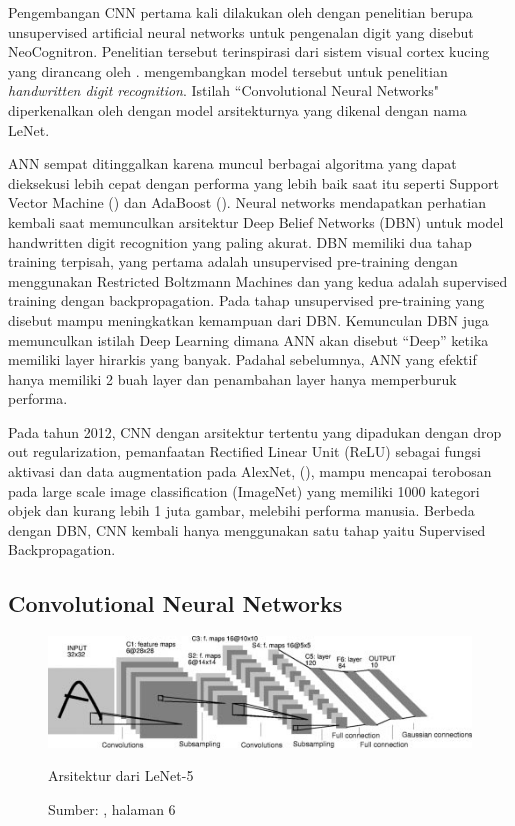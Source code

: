 Pengembangan CNN pertama kali dilakukan oleh \citet{fukushima1982neocognitron} dengan penelitian berupa unsupervised artificial neural networks untuk pengenalan digit yang disebut NeoCognitron. Penelitian tersebut terinspirasi dari sistem visual cortex kucing yang dirancang oleh \citet{hubel1962receptive}. \citet{lecun1989backpropagation} mengembangkan model tersebut untuk penelitian \textit{handwritten digit recognition}. Istilah “Convolutional Neural Networks" diperkenalkan oleh \citet{lecun1998gradient} dengan model arsitekturnya yang dikenal dengan nama LeNet.
	
ANN sempat ditinggalkan karena muncul berbagai algoritma yang dapat dieksekusi lebih cepat dengan performa yang lebih baik saat itu seperti Support Vector Machine (\citet{cortes1995support}) dan AdaBoost (\citet{freund1995desicion}). Neural networks mendapatkan perhatian kembali saat \citet{hinton2006fast} memunculkan arsitektur Deep Belief Networks (DBN) untuk model handwritten digit recognition yang paling akurat. DBN memiliki dua tahap training terpisah, yang pertama adalah unsupervised pre-training dengan menggunakan Restricted Boltzmann Machines dan yang kedua adalah supervised training dengan backpropagation. Pada tahap unsupervised pre-training yang disebut mampu meningkatkan kemampuan dari DBN. Kemunculan DBN juga memunculkan istilah Deep Learning dimana ANN akan disebut “Deep” ketika memiliki layer hirarkis yang banyak. Padahal sebelumnya, ANN yang efektif hanya memiliki 2 buah layer dan penambahan layer hanya memperburuk performa.

Pada tahun 2012, CNN dengan arsitektur tertentu yang dipadukan dengan  drop out regularization, pemanfaatan Rectified Linear Unit (ReLU) sebagai fungsi aktivasi dan data augmentation pada AlexNet, (\citet{krizhevsky2012imagenet}), mampu mencapai terobosan pada large scale image classification (ImageNet) yang memiliki 1000 kategori objek dan kurang lebih 1 juta gambar, melebihi performa manusia. Berbeda dengan DBN, CNN kembali hanya menggunakan satu tahap yaitu Supervised Backpropagation.

\subsection{Convolutional Neural Networks}
\begin{figure}[ht]
 \includegraphics[width=\textwidth]{lecunCNN}
 \caption{Arsitektur dari LeNet-5 \cite{lecun1998gradient}}
  \caption*{Sumber: \citet{lecun1998gradient}, halaman 6}
 \label{fig:lecun}   
\end{figure}

